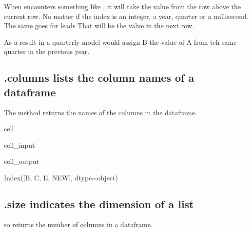 \documentclass[letterpaper,10pt,english]{jupyterBook}
\begin{document}
\sphinxAtStartPar
When  encounters something like , it will take the value from the row above the current row. No matter if the index is an integer, a year, quarter or a millisecond. The same goes for leads   That will be the value in the next row.

\sphinxAtStartPar
As a result in a quarterly model  would assign B the value of A from teh same quarter in the previous year.


\subsection{.columns lists the column names of a dataframe}
\label{\detokenize{content/04_PythonEssentials/PythonPackagesEtc:columns-lists-the-column-names-of-a-dataframe}}
\sphinxAtStartPar
The method  returns the names of the columns in the dataframe.

\begin{sphinxuseclass}{cell}\begin{sphinxVerbatimInput}

\begin{sphinxuseclass}{cell_input}
\begin{sphinxVerbatim}[commandchars=\\\{\}]
\end{sphinxVerbatim}

\end{sphinxuseclass}\end{sphinxVerbatimInput}
\begin{sphinxVerbatimOutput}

\begin{sphinxuseclass}{cell_output}
\begin{sphinxVerbatim}[commandchars=\\\{\}]
Index([\PYGZsq{}B\PYGZsq{}, \PYGZsq{}C\PYGZsq{}, \PYGZsq{}E\PYGZsq{}, \PYGZsq{}NEW\PYGZsq{}], dtype=\PYGZsq{}object\PYGZsq{})
\end{sphinxVerbatim}

\end{sphinxuseclass}\end{sphinxVerbatimOutput}

\end{sphinxuseclass}

\subsection{.size indicates the dimension of a list}
\label{\detokenize{content/04_PythonEssentials/PythonPackagesEtc:size-indicates-the-dimension-of-a-list}}
\sphinxAtStartPar
so  returns the number of columns in a dataframe.
\end{document}
